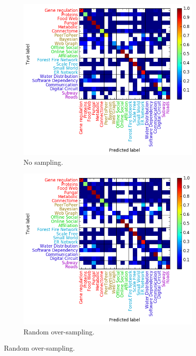 \begin{figure}[H]
	\begin{subfigure}{0.48\textwidth}
	\includegraphics[width=\linewidth]{figs/similarity/SubDomain/None/confusion_sub_None.png}
	\caption{No sampling. } \label{no_confusion_sub}
	\end{subfigure}\hspace*{\fill}
	\begin{subfigure}{0.48\textwidth}
	\includegraphics[width=\linewidth]{figs/similarity/SubDomain/RandomOver/confusion_sub_RandomOver.png}
	\caption{Random over-sampling. } \label{random_over_confusion_sub}
	\end{subfigure}
	

\end{figure}
